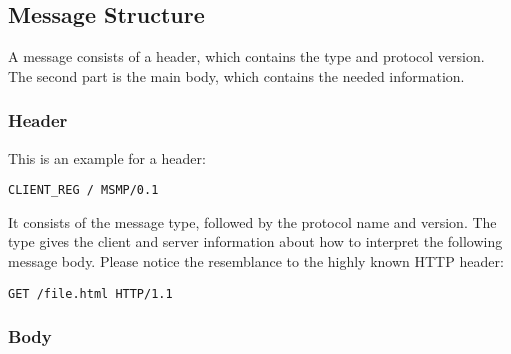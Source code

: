 \subsection{Message Structure}
A message consists of a header, which contains the type and protocol version. The second part is the main body, which contains the needed information.

\subsubsection{Header}

This is an example for a header:
\begin{lstlisting}[caption={A MSMonitor Protocol Header}, label=lst:HeaderMSMP]
CLIENT_REG / MSMP/0.1
\end{lstlisting}
It consists of the message type, followed by the protocol name and version. The type gives the client and server information about how to interpret the following message body.\newline
Please notice the resemblance to the highly known HTTP header:
\begin{lstlisting}[caption={A HTTP Header}, label=lst:HeaderHTTP]
GET /file.html HTTP/1.1
\end{lstlisting} 


\subsubsection{Body}

